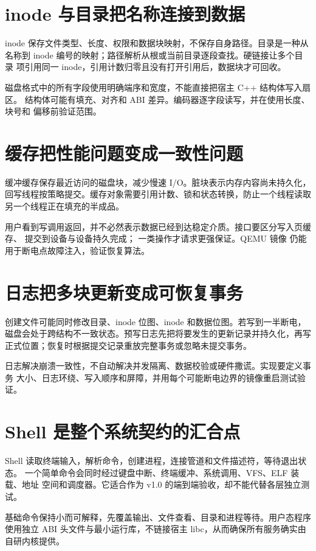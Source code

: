 \section{inode 与目录把名称连接到数据}

inode 保存文件类型、长度、权限和数据块映射，不保存自身路径。目录是一种从
名称到 inode 编号的映射；路径解析从根或当前目录逐段查找。硬链接让多个目录
项引用同一 inode，引用计数归零且没有打开引用后，数据块才可回收。

磁盘格式中的所有字段使用明确端序和宽度，不能直接把宿主 C++ 结构体写入扇区。
结构体可能有填充、对齐和 ABI 差异。编码器逐字段读写，并在使用长度、块号和
偏移前验证范围。

\section{缓存把性能问题变成一致性问题}

缓冲缓存保存最近访问的磁盘块，减少慢速 I/O。脏块表示内存内容尚未持久化，
回写线程按策略提交。缓存对象需要引用计数、锁和状态转换，防止一个线程读取
另一个线程正在填充的半成品。

用户看到写调用返回，并不必然表示数据已经到达稳定介质。接口要区分写入页缓存、
提交到设备与设备持久完成； 一类操作才请求更强保证。QEMU 镜像
仍能用于断电点故障注入，验证恢复算法。

\section{日志把多块更新变成可恢复事务}

创建文件可能同时修改目录、inode 位图、inode 和数据位图。若写到一半断电，
磁盘会处于跨结构不一致状态。预写日志先把将要发生的更新记录并持久化，再写
正式位置；恢复时根据提交记录重放完整事务或忽略未提交事务。

日志解决崩溃一致性，不自动解决并发隔离、数据校验或硬件撒谎。实现要定义事务
大小、日志环绕、写入顺序和屏障，并用每个可能断电边界的镜像重启测试验证。

\section{Shell 是整个系统契约的汇合点}

Shell 读取终端输入，解析命令，创建进程，连接管道和文件描述符，等待退出状态。
一个简单命令会同时经过键盘中断、终端缓冲、系统调用、VFS、ELF 装载、地址
空间和调度器。它适合作为 v1.0 的端到端验收，却不能代替各层独立测试。

基础命令保持小而可解释，先覆盖输出、文件查看、目录和进程等待。用户态程序
使用独立 ABI 头文件与最小运行库，不链接宿主 libc，从而确保所有服务确实由
自研内核提供。
